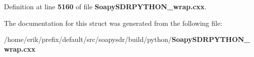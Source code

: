 Definition at line {\bf 5160} of file {\bf Soapy\+S\+D\+R\+P\+Y\+T\+H\+O\+N\+\_\+wrap.\+cxx}.



The documentation for this struct was generated from the following file\+:\begin{DoxyCompactItemize}
\item 
/home/erik/prefix/default/src/soapysdr/build/python/{\bf Soapy\+S\+D\+R\+P\+Y\+T\+H\+O\+N\+\_\+wrap.\+cxx}\end{DoxyCompactItemize}
